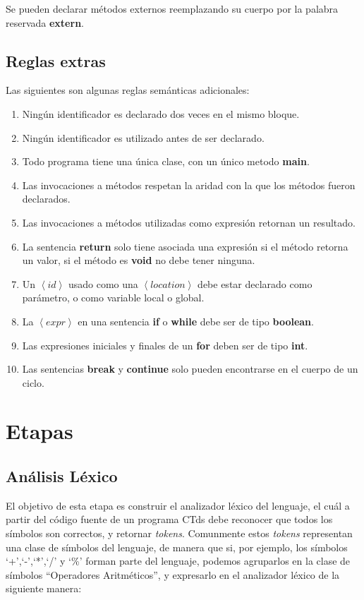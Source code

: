 \documentclass[11pt,a4paper]{article}
\begin{document}
Se pueden declarar métodos externos reemplazando su cuerpo por la palabra reservada \textbf{extern}.

\subsection{Reglas extras}
\label{extra}

Las siguientes son algunas reglas semánticas adicionales:
\begin{enumerate}
\item Ningún identificador es declarado dos veces en el mismo bloque.
\item Ningún identificador es utilizado antes de ser declarado.
\item Todo programa tiene una única clase, con un único metodo \textbf{main}.
\item Las invocaciones a métodos respetan la aridad con la que los métodos fueron declarados.
\item Las invocaciones a métodos utilizadas como expresión retornan un resultado.
\item La sentencia \textbf{return} solo tiene asociada una expresión si el método retorna un valor, si el método es \textbf{void} no debe tener ninguna.
\item Un $\left\langle id \right\rangle$ usado como una $\left\langle location \right\rangle$ debe estar declarado como parámetro, o como variable local o global.
\item La $\left\langle expr \right\rangle$ en una sentencia \textbf{if} o \textbf{while} debe ser de tipo \textbf{boolean}.
\item Las expresiones iniciales y finales de un \textbf{for} deben ser de tipo \textbf{int}.
\item Las sentencias \textbf{break} y \textbf{continue} solo pueden encontrarse en el cuerpo de un ciclo.
\end{enumerate} 
\section{Etapas} 
\label{sec:etapas}

\subsection{Análisis Léxico} 
\label{subsec:lexico}

El objetivo de esta etapa es construir el analizador léxico del lenguaje, el cuál a partir del código fuente de un programa CTds debe reconocer que todos los símbolos son correctos, y retornar \textit{tokens}. Comunmente estos \textit{tokens} representan una clase de símbolos del lenguaje, de manera que si, por ejemplo, los símbolos `+',`-',`*',`/' y `\%' forman parte del lenguaje, podemos agruparlos en la clase de símbolos ``Operadores Aritméticos'', y expresarlo en el analizador léxico de la siguiente manera:
\\
\end{document}
